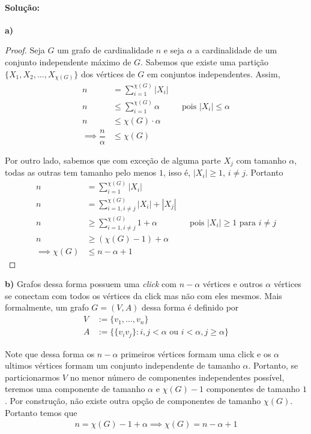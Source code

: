 \documentclass[11pt,a4paper,notitlepage]{exam}
\begin{document}
\paragraph*{Solução: }
\textbf{a)}
\begin{proof}
Seja $G$ um grafo de cardinalidade $n$ e seja $\alpha$ a cardinalidade
de um conjunto independente máximo de $G$. Sabemos que existe uma
partição $\{ X_1, X_2, \dots, X_{\chi(G)} \}$ dos vértices de $G$ em
conjuntos independentes. Assim, 
\begin{align*}
    n &= \sum_{i=1}^{\chi(G)}|X_i|\\
    n &\leq \sum_{i=1}^{\chi(G)}\alpha && \text{pois $|X_i| \leq
    \alpha$}\\
    n &\leq \chi(G)\cdot \alpha\\
    \implies \dfrac{n}{\alpha} &\leq \chi(G)
\end{align*}

Por outro lado, sabemos que com exceção de alguma parte $X_j$ com
tamanho $\alpha$, todas as outras
tem tamanho pelo menos $1$, isso é, $|X_i| \geq 1$, $i \neq j$. Portanto
\begin{align*}
    n &= \sum_{i=1}^{\chi(G)}|X_i|\\
    n &= \sum_{i=1,i\neq j}^{\chi(G)}|X_i| + |X_j|\\
    n &\geq \sum_{i=1,i\neq j}^{\chi(G)}1  + \alpha && \text{pois $|X_i|
    \geq 1$ para $i\neq j$}\\
    n &\geq (\chi(G) -1) + \alpha\\
    \implies \chi(G) &\leq n - \alpha + 1
\end{align*}
\end{proof}
\textbf{b)} Grafos dessa forma possuem uma \textit{click} com $n-\alpha$
vértices e outros $\alpha$ vértices se conectam com todos os vértices da
click mas não com eles mesmos. Mais formalmente, um grafo $G=(V, A)$ dessa
forma é definido por
\begin{align*}
V &:= \{v_1, \dots, v_n\}\\
A &:= \{ \{v_iv_j\}: i,j < \alpha \text{ ou  } i<\alpha,j \geq \alpha\}
\end{align*}

Note que dessa forma os $n-\alpha$ primeiros vértices formam uma click e
os $\alpha$ ultimos vértices formam um conjunto independente de tamanho
$\alpha$. Portanto, se particionarmos $V$ no menor número de componentes
independentes possível, teremos uma componente de tamanho $\alpha$ e
$\chi(G) -1$ componentes de tamanho $1$. Por construção, não existe
outra opção de componentes de tamanho $\chi(G)$. Portanto temos que
\begin{align*}
    n = \chi(G) -1 + \alpha \implies \chi(G) = n -\alpha + 1
\end{align*}
\end{document}
